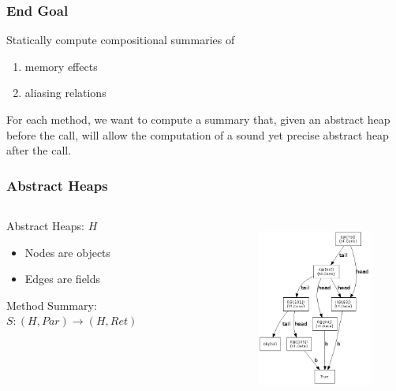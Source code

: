 \documentclass[hyperref={pdfpagelabels=false}]{beamer}
\begin{document}
\begin{frame}
\frametitle{End Goal}
    Statically compute compositional summaries of
    \begin{enumerate}
        \item memory effects
        \item aliasing relations
    \end{enumerate}

    \vspace{25pt}
    For each method, we want to compute a summary that, given an abstract heap
    before the call, will allow the computation of a sound yet precise abstract
    heap after the call.
\end{frame}

\begin{frame}
\frametitle{Abstract Heaps}
  \begin{columns}
    \begin{column}{0.4\textwidth}

        Abstract Heaps: $H$
        \begin{itemize}
            \item Nodes are objects
            \item Edges are fields
        \end{itemize}

        \vspace{10pt}
        Method Summary:
        $S : (H, Par) \rightarrow (H, Ret)$


    \end{column}
    \begin{column}{0.6\textwidth}
      \begin{figure}[t]
            \includegraphics[height=60mm]{images/aheap.png}\\
      \end{figure}
    \end{column}
  \end{columns}
\end{frame}
\end{document}
